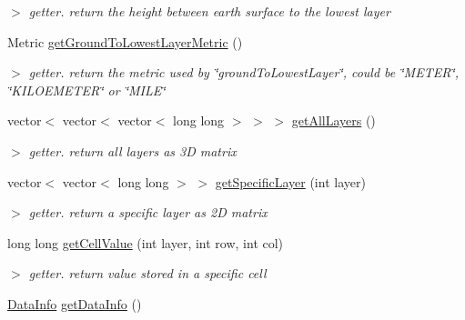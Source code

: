 \begin{DoxyCompactItemize}
\begin{DoxyCompactList}\small\item\em $>$ getter. return the height between earth surface to the lowest layer \end{DoxyCompactList}\item 
\hypertarget{classGridLayer_a51585377aaa1a7a72f6b2e516f22cdfb}{\-Metric \hyperlink{classGridLayer_a51585377aaa1a7a72f6b2e516f22cdfb}{get\-Ground\-To\-Lowest\-Layer\-Metric} ()}\label{classGridLayer_a51585377aaa1a7a72f6b2e516f22cdfb}

\begin{DoxyCompactList}\small\item\em $>$ getter. return the metric used by \char`\"{}ground\-To\-Lowest\-Layer\char`\"{}, could be \char`\"{}\-M\-E\-T\-E\-R\char`\"{}, \char`\"{}\-K\-I\-L\-O\-E\-M\-E\-T\-E\-R\char`\"{} or \char`\"{}\-M\-I\-L\-E\char`\"{} \end{DoxyCompactList}\item 
\hypertarget{classGridLayer_aa66a23f509e0fbe737b61477eb183110}{vector$<$ vector$<$ vector$<$ long \*
long $>$ $>$ $>$ \hyperlink{classGridLayer_aa66a23f509e0fbe737b61477eb183110}{get\-All\-Layers} ()}\label{classGridLayer_aa66a23f509e0fbe737b61477eb183110}

\begin{DoxyCompactList}\small\item\em $>$ getter. return all layers as 3\-D matrix \end{DoxyCompactList}\item 
vector$<$ vector$<$ long long $>$ $>$ \hyperlink{classGridLayer_a4d8fc5058d310668b52decd3dabfd95e}{get\-Specific\-Layer} (int layer)
\begin{DoxyCompactList}\small\item\em $>$ getter. return a specific layer as 2\-D matrix \end{DoxyCompactList}\item 
long long \hyperlink{classGridLayer_a9f83a516dacd8030957dd1d70474bc60}{get\-Cell\-Value} (int layer, int row, int col)
\begin{DoxyCompactList}\small\item\em $>$ getter. return value stored in a specific cell \end{DoxyCompactList}\item 
\hypertarget{classGridLayer_a36ceb6db89b190d4575f6f54809c39b8}{\hyperlink{structDataInfo}{\-Data\-Info} \hyperlink{classGridLayer_a36ceb6db89b190d4575f6f54809c39b8}{get\-Data\-Info} ()}\label{classGridLayer_a36ceb6db89b190d4575f6f54809c39b8}


\end{DoxyCompactItemize}
